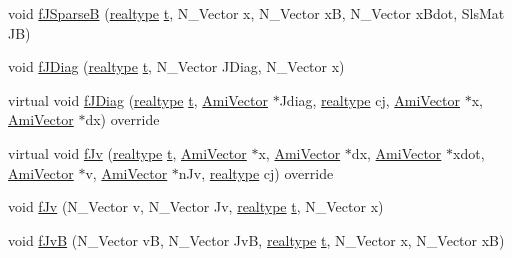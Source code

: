 \begin{DoxyCompactItemize}
void \mbox{\hyperlink{classamici_1_1_model___o_d_e_a0e8a82c9c78706dddbe191d2ed6540a3}{f\+J\+SparseB}} (\mbox{\hyperlink{namespaceamici_a1bdce28051d6a53868f7ccbf5f2c14a3}{realtype}} \mbox{\hyperlink{classamici_1_1_model_a711281d57e9710226face29151cc4641}{t}}, N\+\_\+\+Vector x, N\+\_\+\+Vector xB, N\+\_\+\+Vector x\+Bdot, Sls\+Mat JB)
\item 
void \mbox{\hyperlink{classamici_1_1_model___o_d_e_a894cb7158f20a976348caa9d73520d40}{f\+J\+Diag}} (\mbox{\hyperlink{namespaceamici_a1bdce28051d6a53868f7ccbf5f2c14a3}{realtype}} \mbox{\hyperlink{classamici_1_1_model_a711281d57e9710226face29151cc4641}{t}}, N\+\_\+\+Vector J\+Diag, N\+\_\+\+Vector x)
\item 
virtual void \mbox{\hyperlink{classamici_1_1_model___o_d_e_a79269ef1a74e1ad9e313dce0e4220291}{f\+J\+Diag}} (\mbox{\hyperlink{namespaceamici_a1bdce28051d6a53868f7ccbf5f2c14a3}{realtype}} \mbox{\hyperlink{classamici_1_1_model_a711281d57e9710226face29151cc4641}{t}}, \mbox{\hyperlink{classamici_1_1_ami_vector}{Ami\+Vector}} $\ast$Jdiag, \mbox{\hyperlink{namespaceamici_a1bdce28051d6a53868f7ccbf5f2c14a3}{realtype}} cj, \mbox{\hyperlink{classamici_1_1_ami_vector}{Ami\+Vector}} $\ast$x, \mbox{\hyperlink{classamici_1_1_ami_vector}{Ami\+Vector}} $\ast$dx) override
\item 
virtual void \mbox{\hyperlink{classamici_1_1_model___o_d_e_a1a0549510cbe20e4d3c28bf77fc722ed}{f\+Jv}} (\mbox{\hyperlink{namespaceamici_a1bdce28051d6a53868f7ccbf5f2c14a3}{realtype}} \mbox{\hyperlink{classamici_1_1_model_a711281d57e9710226face29151cc4641}{t}}, \mbox{\hyperlink{classamici_1_1_ami_vector}{Ami\+Vector}} $\ast$x, \mbox{\hyperlink{classamici_1_1_ami_vector}{Ami\+Vector}} $\ast$dx, \mbox{\hyperlink{classamici_1_1_ami_vector}{Ami\+Vector}} $\ast$xdot, \mbox{\hyperlink{classamici_1_1_ami_vector}{Ami\+Vector}} $\ast$v, \mbox{\hyperlink{classamici_1_1_ami_vector}{Ami\+Vector}} $\ast$n\+Jv, \mbox{\hyperlink{namespaceamici_a1bdce28051d6a53868f7ccbf5f2c14a3}{realtype}} cj) override
\item 
void \mbox{\hyperlink{classamici_1_1_model___o_d_e_a01252ccb85bec7adbc88d12fce4fde05}{f\+Jv}} (N\+\_\+\+Vector v, N\+\_\+\+Vector Jv, \mbox{\hyperlink{namespaceamici_a1bdce28051d6a53868f7ccbf5f2c14a3}{realtype}} \mbox{\hyperlink{classamici_1_1_model_a711281d57e9710226face29151cc4641}{t}}, N\+\_\+\+Vector x)
\item 
void \mbox{\hyperlink{classamici_1_1_model___o_d_e_af9c1f29040dc3c6c8bca0703676843be}{f\+JvB}} (N\+\_\+\+Vector vB, N\+\_\+\+Vector JvB, \mbox{\hyperlink{namespaceamici_a1bdce28051d6a53868f7ccbf5f2c14a3}{realtype}} \mbox{\hyperlink{classamici_1_1_model_a711281d57e9710226face29151cc4641}{t}}, N\+\_\+\+Vector x, N\+\_\+\+Vector xB)

\end{DoxyCompactItemize}
